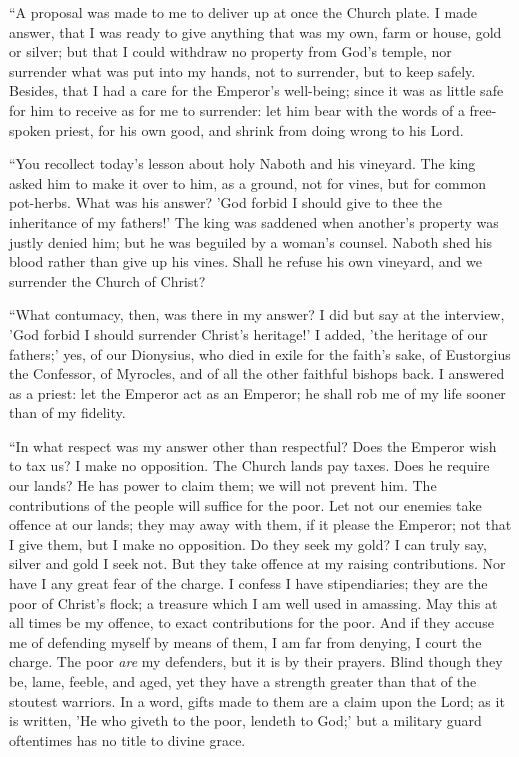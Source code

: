 ``A proposal was made to me to deliver up at once the Church
plate. I made answer, that I was ready to give anything that was my
own, farm or house, gold or silver; but that I could withdraw no
property from God's temple, nor surrender what was put into my hands,
not to surrender, but to keep safely. Besides, that I had a care for
the Emperor's well-being; since it was as little safe for him to
receive as for me to surrender: let him bear with the words of a
free-spoken priest, for his own good, and shrink from doing wrong to
his Lord.

``You recollect today's lesson about holy Naboth and his
vineyard. The king asked him to make it over to him, as a ground, not
for vines, but for common pot-herbs. What was his answer? 'God forbid
I should give to thee the inheritance of my fathers!' The king was
saddened when another's property was justly denied him; but he was
beguiled by a woman's counsel. Naboth shed his blood rather than give
up his vines. Shall he refuse his own vineyard, and we surrender the
Church of Christ?

``What contumacy, then, was there in my answer? I did but say
at the interview, 'God forbid I should surrender Christ's heritage!' I
added, 'the heritage of our fathers;' yes, of our Dionysius, who died
in exile for the faith's sake, of Eustorgius the Confessor, of
Myrocles, and of all the other faithful bishops back. I answered as a priest: let the Emperor act as an Emperor; he shall rob me of my
life sooner than of my fidelity.

``In what respect was my answer other than respectful? Does the
Emperor wish to tax us? I make no opposition. The Church lands pay
taxes. Does he require our lands? He has power to claim them; we will
not prevent him. The contributions of the people will suffice for the
poor. Let not our enemies take offence at our lands; they may away
with them, if it please the Emperor; not that I give them, but I make
no opposition. Do they seek my gold? I can truly say, silver and gold
I seek not. But they take offence at my raising contributions. Nor
have I any great fear of the charge. I confess I have stipendiaries;
they are the poor of Christ's flock; a treasure which I am well used
in amassing. May this at all times be my offence, to exact
contributions for the poor. And if they accuse me of defending myself
by means of them, I am far from denying, I court the charge. The poor \emph{are}
my defenders, but it is by their prayers. Blind though they be, lame,
feeble, and aged, yet they have a strength greater than that of the
stoutest warriors. In a word, gifts made to them are a claim upon the
Lord; as it is written, 'He who giveth to the poor, lendeth to God;'
but a military guard oftentimes has no title to divine grace.

